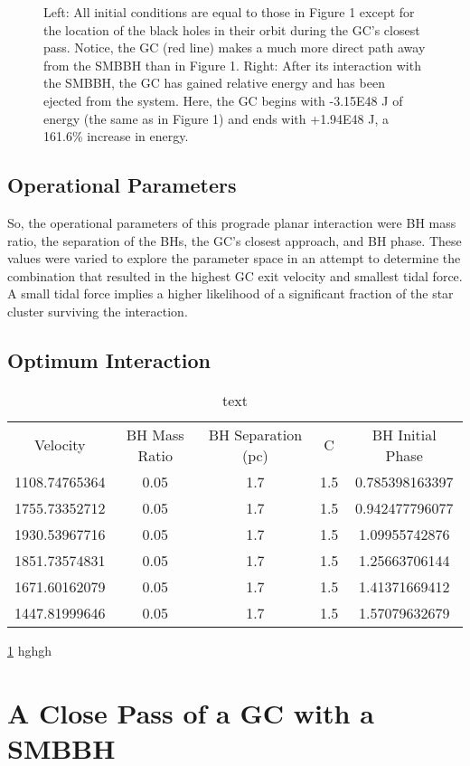 \documentclass{aastex62}
\begin{document}
\begin{figure}

\caption{Left: All initial conditions are equal to those in Figure 1 except for the location of the black holes in their orbit during the GC's closest pass. Notice, the GC (red line) makes a much more direct path away from the SMBBH than in Figure 1. Right: After its interaction with the SMBBH, the GC has gained relative energy and has been ejected from the system. Here, the GC begins with -3.15E48 J of energy (the same as in Figure 1) and ends with +1.94E48 J, a 161.6\% increase in energy.}
\end{figure}
\subsection{Operational Parameters}
So, the operational parameters of this prograde planar interaction were BH mass ratio, the separation of the BHs, the GC's closest approach, and BH phase. These values were varied to explore the parameter space in an attempt to determine the combination that resulted in the highest GC exit velocity and smallest tidal force. A small tidal force implies a higher likelihood of a significant fraction of the star cluster surviving the interaction. 
\subsection{Optimum Interaction}
\begin{table}
\centering
\caption{text\label{key}}

\begin{tabular}{ccccc}
\hline \hline
Velocity & BH Mass Ratio & BH Separation (pc) & C & BH Initial Phase \\
1108.74765364 & 0.05 & 1.7 & 1.5 & 0.785398163397 \\
1755.73352712 & 0.05 & 1.7 & 1.5 & 0.942477796077 \\
1930.53967716 & 0.05 & 1.7 & 1.5 & 1.09955742876 \\
1851.73574831 & 0.05 & 1.7 & 1.5 & 1.25663706144 \\
1671.60162079 & 0.05 & 1.7 & 1.5 & 1.41371669412 \\
1447.81999646 & 0.05 & 1.7 & 1.5 & 1.57079632679
\end{tabular}
\end{table}
\ref{key} hghgh

\section{A Close Pass of a GC with a SMBBH}
\end{document}
